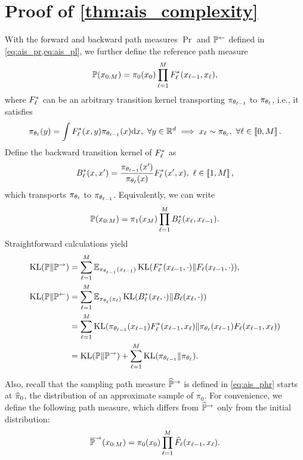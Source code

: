 \section{Proof of \cref{thm:ais_complexity}}
\label{prf:thm:ais_complexity}
With the forward and backward path measures $\Pr$ and $\mathbb{P}^\gets$ defined in \cref{eq:ais_pr,eq:ais_pl}, we further define the reference path measure
\begin{equation}
    \mathbb{P}(x_{0:M})=\pi_0(x_0)\prod_{\ell=1}^{M}F^*_\ell(x_{\ell-1},x_\ell),
    \label{eq:ais_p}
\end{equation}
where $F^*_\ell$ can be an arbitrary transition kernel transporting $\pi_{\theta_{\ell-1}}$ to $\pi_{\theta_\ell}$, i.e., it satisfies 
$$\pi_{\theta_\ell}(y)=\int F^*_\ell(x,y)\pi_{\theta_{\ell-1}}(x)\mathrm{d} x,~\forall y\in\mathbb{R}^d\implies x_\ell\sim\pi_{\theta_\ell},~\forall\ell\in\left[\!\left[0,M\right]\!\right].$$
Define the backward transition kernel of $F^*_\ell$ as
$$B^*_\ell(x,x')=\frac{\pi_{\theta_{\ell-1}}(x')}{\pi_{\theta_\ell}(x)}F^*_\ell(x',x),~\ell\in\left[\!\left[1,M\right]\!\right],$$
which transports $\pi_{\theta_\ell}$ to $\pi_{\theta_{\ell-1}}$. Equivalently, we can write
$$\mathbb{P}(x_{0:M})=\pi_1(x_{M})\prod_{\ell=1}^{M}B^*_\ell(x_\ell,x_{\ell-1}).$$
Straightforward calculations yield
\begin{align}
    \operatorname{KL}(\mathbb{P}\|\mathbb{P}^\to) & =\sum_{\ell=1}^{M}\operatorname{\mathbb{E}}_{\pi_{\theta_{\ell-1}}(x_{\ell-1})}{\operatorname{KL}(F^*_\ell(x_{\ell-1},\cdot)\|F_\ell(x_{\ell-1},\cdot))},\nonumber                          \\
    \operatorname{KL}(\mathbb{P}\|\mathbb{P}^\gets) & =\sum_{\ell=1}^{M}\operatorname{\mathbb{E}}_{\pi_{\theta_\ell}(x_\ell)}{\operatorname{KL}(B^*_\ell(x_\ell,\cdot)\|B_\ell(x_\ell,\cdot))}  \nonumber                                         \\
                 & =\sum_{\ell=1}^{M}\operatorname{KL}(\pi_{\theta_{\ell-1}}(x_{\ell-1})F^*_\ell(x_{\ell-1},x_\ell)\|\pi_{\theta_\ell}(x_{\ell-1})F_\ell(x_{\ell-1},x_\ell))\label{eq:kl_p_pl} \\
                 & =\operatorname{KL}(\mathbb{P}\|\mathbb{P}^\to)+\sum_{\ell=1}^{M}\operatorname{KL}(\pi_{\theta_{\ell-1}}\|\pi_{\theta_\ell}).\label{eq:kl_p_pl_ge_kl_p_pr}
\end{align}

Also, recall that the sampling path measure $\widehat{\mathbb{P}}^\to$ is defined in \cref{eq:ais_phr} starts at $\widehat{\pi}_0$, the distribution of an approximate sample of $\pi_0$. For convenience, we define the following path measure, which differs from $\widehat{\mathbb{P}}^\to$ only from the initial distribution:
\begin{equation}
    \overline{\mathbb{P}}^\to(x_{0:M})=\pi_0(x_0)\prod_{\ell=1}^{M}\widehat{F}_\ell(x_{\ell-1},x_\ell).
    \label{eq:ais_ptr}
\end{equation}

